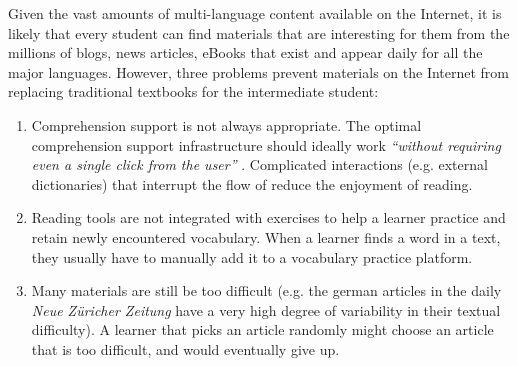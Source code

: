 
Given the vast amounts of multi-language content available on the Internet, it is likely that every student can find materials that are interesting for them from the millions of blogs, news articles, eBooks that exist and appear daily for all the major languages. 
% 
% 
% 
% 
% 
% 
% 
However, three problems prevent materials on the Internet from replacing traditional textbooks for the intermediate student:

\begin{enumerate}
	

  \item Comprehension support is not always appropriate. The optimal comprehension support infrastructure should ideally work {\em ``without requiring even a single click from the user''} \cite{Proszeky02-Comprehension}. 
  Complicated interactions (e.g. external dictionaries) that interrupt the flow of reduce the enjoyment of reading.
  
  \item Reading tools are not integrated with exercises to help a learner practice and retain newly encountered vocabulary. When a learner finds a word in a text, they usually have to manually add it to a vocabulary practice platform. 

  \item Many materials are still be too difficult (e.g. the german articles in the  daily {\em Neue Z\"uricher Zeitung} have a very high degree of variability in their textual difficulty). A learner that picks an article randomly might choose an article that is too difficult, and would eventually give up. 

  
\end{enumerate}


